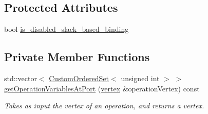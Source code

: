 \subsection*{Protected Attributes}
\begin{DoxyCompactItemize}
\item 
bool \hyperlink{structmodule__binding__check_a84ced41c5c2da50b99a13712f258c63e}{is\+\_\+disabled\+\_\+slack\+\_\+based\+\_\+binding}
\end{DoxyCompactItemize}
\subsection*{Private Member Functions}
\begin{DoxyCompactItemize}
\item 
std\+::vector$<$ \hyperlink{classCustomOrderedSet}{Custom\+Ordered\+Set}$<$ unsigned int $>$ $>$ \hyperlink{structmodule__binding__check_a35fd352dca13ac8152dea12b3f4a9e09}{get\+Operation\+Variables\+At\+Port} (\hyperlink{graph_8hpp_abefdcf0544e601805af44eca032cca14}{vertex} \&operation\+Vertex) const
\begin{DoxyCompactList}\small\item\em Takes as input the vertex of an operation, and returns a vertex. \end{DoxyCompactList}\end{DoxyCompactItemize}
